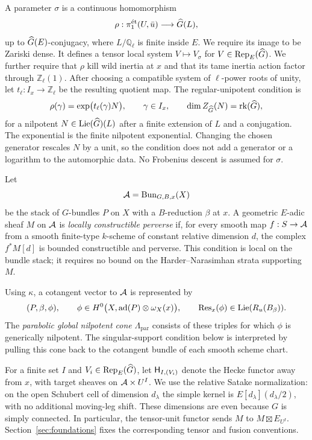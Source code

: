 A parameter $\sigma$ is a continuous homomorphism
\begin{equation}\label{eq:parameter}
 \rho:\pi_1^{\mathrm{\acute et}}(U,\bar u)\longrightarrow\widehat G(L),
\end{equation}
up to $\widehat G(E)$-conjugacy, where $L/\mathbb Q_\ell$ is finite inside $E$.
We require its image to be Zariski dense. It defines a tensor local system
$V\mapsto V_\sigma$ for $V\in\operatorname{Rep}_E(\widehat G)$.
We further require that $\rho$ kill wild inertia at $x$ and that its tame
inertia action factor through $\mathbb Z_\ell(1)$.
After choosing a compatible system of $\ell$-power roots of unity, let
$t_\ell:I_x\to\mathbb Z_\ell$ be the resulting quotient map.
The regular-unipotent condition is
\begin{equation}\label{eq:regular-monodromy}
 \rho(\gamma)=\exp\bigl(t_\ell(\gamma)N\bigr),\qquad \gamma\in I_x,
 \qquad \dim Z_{\widehat G}(N)=\operatorname{rk}(\widehat G),
\end{equation}
for a nilpotent $N\in\operatorname{Lie}(\widehat G)(L)$ after a finite extension of $L$ and a
conjugation. The exponential is the finite nilpotent exponential.
Changing the chosen generator rescales $N$ by a unit, so the condition does
not add a generator or a logarithm to the automorphic data.
No Frobenius descent is assumed for $\sigma$.

Let
\[
 \mathcal A=\operatorname{Bun}_{G,B,x}(X)
\]
be the stack of $G$-bundles $P$ on $X$ with a $B$-reduction $\beta$ at $x$.
A geometric $E$-adic sheaf $M$ on $\mathcal A$ is \emph{locally constructible
perverse} if, for every smooth map $f:S\to\mathcal A$ from a smooth finite-type
$k$-scheme of constant relative dimension $d$, the complex $f^*M[d]$ is
bounded constructible and perverse. This condition is local on the bundle
stack; it requires no bound on the Harder--Narasimhan strata supporting $M$.

Using $\kappa$, a cotangent vector to $\mathcal A$ is represented by
\[
 (P,\beta,\phi),\qquad
 \phi\in H^0\bigl(X,\operatorname{ad}(P)\otimes\omega_X(x)\bigr),\qquad
 \operatorname{Res}_x(\phi)\in\operatorname{Lie}(R_u(B_\beta)).
\]
The \emph{parabolic global nilpotent cone} $\Lambda_{\mathrm{par}}$ consists
of these triples for which $\phi$ is generically nilpotent.
The singular-support condition below is interpreted by pulling this cone
back to the cotangent bundle of each smooth scheme chart.

For a finite set $I$ and $V_i\in\operatorname{Rep}_E(\widehat G)$, let
$\mathsf H_{I,(V_i)}$ denote the Hecke functor away from $x$, with target
sheaves on $\mathcal A\times U^I$.
We use the relative Satake normalization: on the open Schubert cell of
dimension $d_\lambda$ the simple kernel is
$E[d_\lambda](d_\lambda/2)$, with no additional moving-leg shift.
These dimensions are even because $G$ is simply connected.
In particular, the tensor-unit functor sends $M$ to
$M\boxtimes E_{U^I}$.
Section~\ref{sec:foundations} fixes the corresponding tensor and fusion
conventions.

